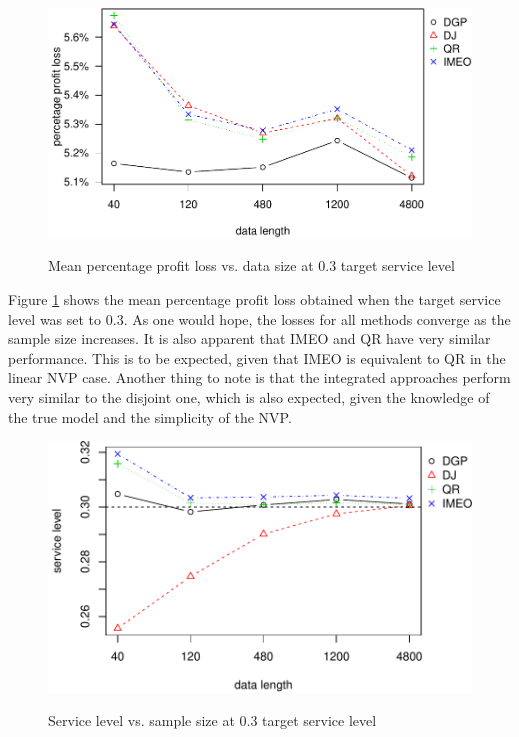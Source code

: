 \documentclass[a4paper,11pt]{article}
\begin{document}
\begin{figure}[htb]
\centering
\caption{Mean percentage profit loss vs. data size at 0.3 target service level}
\includegraphics{ppl0.3.pdf}
\label{fig:ppl0.3}
\end{figure}

Figure \ref{fig:ppl0.3} shows the mean percentage profit loss obtained when the target service level was set to $0.3$. As one would hope, the losses for all methods converge as the sample size increases. It is also apparent that IMEO and QR have very similar performance. This is to be expected, given that IMEO is equivalent to QR in the linear NVP case. Another thing to note is that the integrated approaches perform very similar to the disjoint one, which is also expected, given the knowledge of the true model and the simplicity of the NVP.

\begin{figure}[htb]
\centering
\caption{Service level vs. sample size at 0.3 target service level}
\includegraphics{sl0.3.pdf}
\label{fig:sl0.3}
\end{figure}
\end{document}
